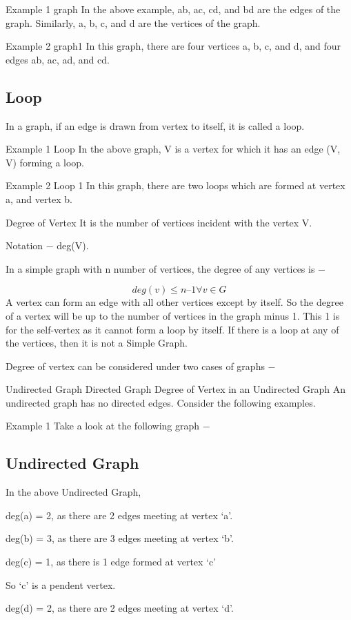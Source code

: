 Example 1
graph
In the above example, ab, ac, cd, and bd are the edges of the graph. Similarly, a, b, c, and d are the vertices of the graph.

Example 2
graph1
In this graph, there are four vertices a, b, c, and d, and four edges ab, ac, ad, and cd.

\subsection{Loop}
In a graph, if an edge is drawn from vertex to itself, it is called a loop.

Example 1
Loop
In the above graph, V is a vertex for which it has an edge (V, V) forming a loop.

Example 2
Loop 1
In this graph, there are two loops which are formed at vertex a, and vertex b.

Degree of Vertex
It is the number of vertices incident with the vertex V.

Notation − deg(V).

In a simple graph with n number of vertices, the degree of any vertices is −

\[deg(v) ≤ n – 1 ∀ v \in G \]
A vertex can form an edge with all other vertices except by itself. So the degree of a vertex will be up to the number of vertices in the graph minus 1. This 1 is for the self-vertex as it cannot form a loop by itself. If there is a loop at any of the vertices, then it is not a Simple Graph.

Degree of vertex can be considered under two cases of graphs −

Undirected Graph
Directed Graph
Degree of Vertex in an Undirected Graph
An undirected graph has no directed edges. Consider the following examples.

Example 1
Take a look at the following graph −

\subsection{Undirected Graph}
In the above Undirected Graph,

deg(a) = 2, as there are 2 edges meeting at vertex ‘a’.

deg(b) = 3, as there are 3 edges meeting at vertex ‘b’.

deg(c) = 1, as there is 1 edge formed at vertex ‘c’

So ‘c’ is a pendent vertex.

deg(d) = 2, as there are 2 edges meeting at vertex ‘d’.

